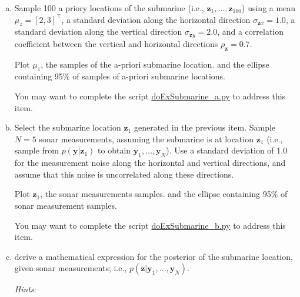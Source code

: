\documentclass[12pt]{article}
\begin{document}
\begin{enumerate}[(a)]

    \item Sample 100 a priory locations of the submarine
        (i.e., $\mathbf{z}_1,\ldots,\mathbf{z}_{100}$) using
        a mean $\mu_z=[2,3]^\intercal$, a standard deviation along the
        horizontal direction $\sigma_{\mathbf{z}x}=1.0$, a standard
        deviation along the vertical direction $\sigma_{\mathbf{z}y}=2.0$,
        and a correlation coefficient between the vertical and horizontal
        directions $\rho_{\mathbf{z}}=0.7$.

        Plot $\mu_z$, the samples of the a-priori submarine location. and the
        ellipse containing 95\% of samples of a-priori submarine locations.

        You may want to complete the script
        \href{https://github.com/joacorapela/gcnuBridging2023/blob/master/code/scripts/probability/multivariateGaussians/inferenceInTheLinearGaussianModel/doExSubmarine_a.py}{doExSubmarine\_a.py}
        to address this item.

    \item Select the submarine location $\mathbf{z}_1$ generated in
        the previous item. Sample $N=5$ sonar measurements, assuming the
        submarine is at location $\mathbf{z}_1$ (i.e., sample from
        $p(\mathbf{y}|\mathbf{z}_1)$ to obtain
        $\mathbf{y}_1,\ldots,\mathbf{y}_N$). Use a standard deviation of
        1.0 for the measurement noise along the horizontal and vertical
        directions, and assume that this noise is uncorrelated along these
        directions.

        Plot $\mathbf{z}_1$, the sonar measurements samples. and the ellipse
        containing 95\% of sonar measurement samples.

        You may want to complete the script
        \href{https://github.com/joacorapela/gcnuBridging2023/blob/master/code/scripts/probability/multivariateGaussians/inferenceInTheLinearGaussianModel/doExSubmarine_b.py}{doExSubmarine\_b.py}
        to address this item.

    \item derive a mathematical expression for the posterior of the
        submarine location, given sonar measurements; i.e.,
        $p(\mathbf{z}|\mathbf{y}_1,\ldots,\mathbf{y}_N)$.

        \textit{Hints}: 

        \begin{itemize}


\end{itemize}
\end{enumerate}
\end{document}
